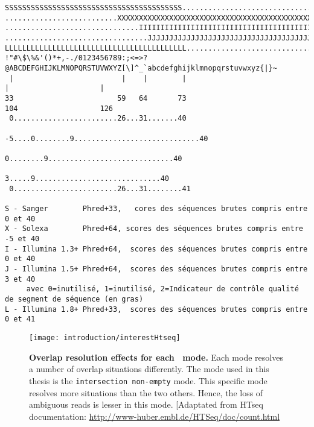 \begin{verbatim}
SSSSSSSSSSSSSSSSSSSSSSSSSSSSSSSSSSSSSSSSS.....................................................
..........................XXXXXXXXXXXXXXXXXXXXXXXXXXXXXXXXXXXXXXXXXXXXXX......................
...............................IIIIIIIIIIIIIIIIIIIIIIIIIIIIIIIIIIIIIIIII......................
.................................JJJJJJJJJJJJJJJJJJJJJJJJJJJJJJJJJJJJJJJ......................
LLLLLLLLLLLLLLLLLLLLLLLLLLLLLLLLLLLLLLLLLL....................................................
!"#\$\%&'()*+,-./0123456789:;<=>?@ABCDEFGHIJKLMNOPQRSTUVWXYZ[\]^_`abcdefghijklmnopqrstuvwxyz{|}~
 |                         |    |        |                              |                     |
33                        59   64       73                            104                   126
 0........................26...31.......40
                          -5....0........9.............................40
                                0........9.............................40
                                   3.....9.............................40
 0........................26...31........41

S - Sanger        Phred+33,   cores des séquences brutes compris entre 0 et 40
X - Solexa        Phred+64, scores des séquences brutes compris entre -5 et 40
I - Illumina 1.3+ Phred+64,  scores des séquences brutes compris entre 0 et 40
J - Illumina 1.5+ Phred+64,  scores des séquences brutes compris entre 3 et 40
     avec 0=inutilisé, 1=inutilisé, 2=Indicateur de contrôle qualité de segment de séquence (en gras)
L - Illumina 1.8+ Phred+33,  scores des séquences brutes compris entre 0 et 41
\end{verbatim}

\begin{figure}
    \texttt{[image: introduction/interestHtseq]}\centering
    \caption[Overlap resolution effects for each \htseq\
    mode]{\label{fig:htseqMode}\textbf{Overlap resolution effects for each \htseq\
    mode.} Each mode resolves a number of overlap situations differently. The
    mode used in this thesis is the \texttt{intersection non-empty} mode. This
    specific mode resolves more situations than the two others. Hence, the loss
    of ambiguous reads is lesser in this mode. [Adaptated from HTseq
    documentation: \href{http://www-huber.embl.de/HTSeq/doc/count.html}%
    {http://www-huber.embl.de/HTSeq/doc/count.html}}
\end{figure}




